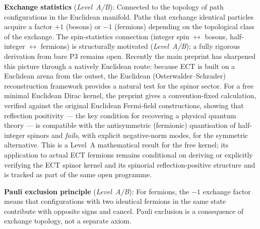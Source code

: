 \documentclass[11pt,a4paper]{article}
\begin{document}
\textbf{Exchange statistics} (\emph{Level~A/B}): Connected to the topology of path configurations in the Euclidean manifold. Paths that exchange identical particles acquire a factor $+1$ (bosons) or $-1$ (fermions) depending on the topological class of the exchange. The spin-statistics connection (integer spin $\leftrightarrow$ bosons, half-integer $\leftrightarrow$ fermions) is structurally motivated (\emph{Level~A/B}); a fully rigorous derivation from bare P3 remains open. Recently the main preprint has sharpened this picture through a natively Euclidean route: because ECT is built on a Euclidean arena from the outset, the Euclidean (Osterwalder--Schrader) reconstruction framework provides a natural test for the spinor sector. For a free minimal Euclidean Dirac kernel, the preprint gives a convention-fixed calculation, verified against the original Euclidean Fermi-field constructions, showing that reflection positivity --- the key condition for recovering a physical quantum theory --- is compatible with the antisymmetric (fermionic) quantisation of half-integer spinors and \emph{fails}, with explicit negative-norm modes, for the symmetric alternative. This is a Level~A mathematical result for the free kernel; its application to actual ECT fermions remains conditional on deriving or explicitly verifying the ECT spinor kernel and its spinorial reflection-positive structure and is tracked as part of the same open programme.

\textbf{Pauli exclusion principle} (\emph{Level~A/B}): For fermions, the $-1$ exchange factor means that configurations with two identical fermions in the same state contribute with opposite signs and cancel. Pauli exclusion is a consequence of exchange topology, not a separate axiom.
\end{document}
